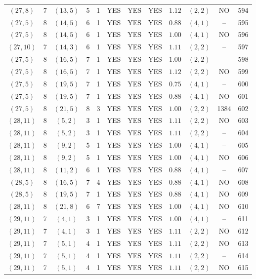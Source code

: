 \begin{longtable}{|c|c|c|c|c|c|c|c|c|c|c|c|}
$(27,8)$ & 7 & $(13,5)$ & 5 & 1 & YES & YES & YES & $1.12$ & $(2,2)$ & NO & 594\\
$(27,5)$ & 8 & $(14,5)$ & 6 & 1 & YES & YES & YES & $0.88$ & $(4,1)$ & -- & 595\\
$(27,5)$ & 8 & $(14,5)$ & 6 & 1 & YES & YES & YES & $1.00$ & $(4,1)$ & NO & 596\\
$(27,10)$ & 7 & $(14,3)$ & 6 & 1 & YES & YES & YES & $1.11$ & $(2,2)$ & -- & 597\\
$(27,5)$ & 8 & $(16,5)$ & 7 & 1 & YES & YES & YES & $1.00$ & $(2,2)$ & -- & 598\\
$(27,5)$ & 8 & $(16,5)$ & 7 & 1 & YES & YES & YES & $1.12$ & $(2,2)$ & NO & 599\\
$(27,5)$ & 8 & $(19,5)$ & 7 & 1 & YES & YES & YES & $0.75$ & $(4,1)$ & -- & 600\\
$(27,5)$ & 8 & $(19,5)$ & 7 & 1 & YES & YES & YES & $0.88$ & $(4,1)$ & NO & 601\\
$(27,5)$ & 8 & $(21,5)$ & 8 & 3 & YES & YES & YES & $1.00$ & $(2,2)$ & 1384 & 602\\
$(28,11)$ & 8 & $(5,2)$ & 3 & 1 & YES & YES & YES & $1.11$ & $(2,2)$ & NO & 603\\
$(28,11)$ & 8 & $(5,2)$ & 3 & 1 & YES & YES & YES & $1.11$ & $(2,2)$ & -- & 604\\
$(28,11)$ & 8 & $(9,2)$ & 5 & 1 & YES & YES & YES & $1.00$ & $(4,1)$ & -- & 605\\
$(28,11)$ & 8 & $(9,2)$ & 5 & 1 & YES & YES & YES & $1.00$ & $(4,1)$ & NO & 606\\
$(28,11)$ & 8 & $(11,2)$ & 6 & 1 & YES & YES & YES & $0.88$ & $(4,1)$ & -- & 607\\
$(28,5)$ & 8 & $(16,5)$ & 7 & 4 & YES & YES & YES & $0.88$ & $(4,1)$ & NO & 608\\
$(28,5)$ & 8 & $(19,5)$ & 7 & 1 & YES & YES & YES & $0.88$ & $(4,1)$ & NO & 609\\
$(28,11)$ & 8 & $(21,8)$ & 6 & 7 & YES & YES & YES & $1.00$ & $(4,1)$ & NO & 610\\
$(29,11)$ & 7 & $(4,1)$ & 3 & 1 & YES & YES & YES & $1.00$ & $(4,1)$ & -- & 611\\
$(29,11)$ & 7 & $(4,1)$ & 3 & 1 & YES & YES & YES & $1.11$ & $(2,2)$ & NO & 612\\
$(29,11)$ & 7 & $(5,1)$ & 4 & 1 & YES & YES & YES & $1.11$ & $(2,2)$ & NO & 613\\
$(29,11)$ & 7 & $(5,1)$ & 4 & 1 & YES & YES & YES & $1.11$ & $(2,2)$ & -- & 614\\
$(29,11)$ & 7 & $(5,1)$ & 4 & 1 & YES & YES & YES & $1.11$ & $(2,2)$ & NO & 615\\

\end{longtable}

